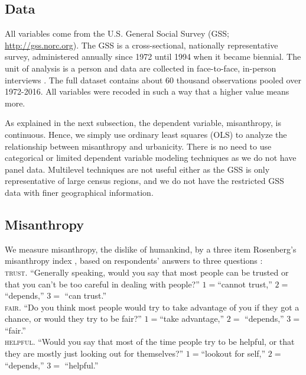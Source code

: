\documentclass[11pt, letterpaper]{article}
\begin{document}
\begin{spacing}{1.4}
\subsection*{Data}

All variables come from the U.S. General Social Survey (GSS;
\url{http://gss.norc.org}). The GSS is a cross-sectional, nationally
representative survey, administered annually since 1972 until 1994 when it
became biennial. The unit of analysis is a person and data are collected in face-to-face, in-person interviews \citep{davis07}. The full dataset contains about 60 thousand observations pooled over 1972-2016. All variables were recoded in such a way that a higher value means more. 

As explained in the next subsection, the dependent variable, misanthropy, is continuous. Hence, we simply use ordinary least squares (OLS) to analyze the relationship between misanthropy and urbanicity.
{There is no need to use categorical or limited dependent variable modeling techniques as we do not have panel data. Multilevel techniques are not useful either as the GSS is only representative of large census regions, and we do not have the restricted GSS data with finer geographical information.} 

\subsection*{Misanthropy}

We measure misanthropy, the dislike of humankind, by a three item  Rosenberg's  misanthropy index \citep{rosenberg56}, based on respondents' answers to three questions \citep{smith97}:\\

\indent\textsc{trust}. ``Generally speaking, would you say that most people can be trusted or that you can't be too
careful in dealing with people?''  $1=$``cannot trust,'' $2=$     ``depends,'' $3=$   ``can trust.''\\
\indent\textsc{fair}. ``Do you think most people would try to take advantage of you if they got a chance, or
would they try to be fair?'' $1=$``take advantage,'' $2=$       ``depends,'' $3=$          ``fair.'' \\
\indent\textsc{helpful}. ``Would you say that most of the time people try to be helpful, or that they are mostly just
looking out for themselves?'' $1=$``lookout for self,'' $2=$       ``depends,'' $3=$        ``helpful.''\\ 


\end{spacing}
\end{document}
